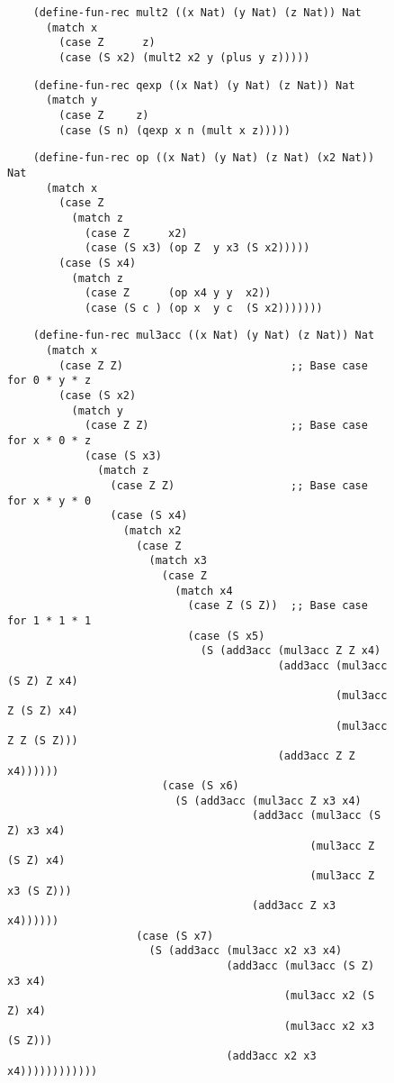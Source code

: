 \begin{figure}
  \begin{verbatim}
    (define-fun-rec mult2 ((x Nat) (y Nat) (z Nat)) Nat
      (match x
        (case Z      z)
        (case (S x2) (mult2 x2 y (plus y z)))))
  \end{verbatim}

  \begin{verbatim}
    (define-fun-rec qexp ((x Nat) (y Nat) (z Nat)) Nat
      (match y
        (case Z     z)
        (case (S n) (qexp x n (mult x z)))))
  \end{verbatim}

  \begin{verbatim}
    (define-fun-rec op ((x Nat) (y Nat) (z Nat) (x2 Nat)) Nat
      (match x
        (case Z
          (match z
            (case Z      x2)
            (case (S x3) (op Z  y x3 (S x2)))))
        (case (S x4)
          (match z
            (case Z      (op x4 y y  x2))
            (case (S c ) (op x  y c  (S x2)))))))
  \end{verbatim}

  \iffalse
  \begin{verbatim}
    (define-fun-rec mul3acc ((x Nat) (y Nat) (z Nat)) Nat
      (match x
        (case Z Z)                          ;; Base case for 0 * y * z
        (case (S x2)
          (match y
            (case Z Z)                      ;; Base case for x * 0 * z
            (case (S x3)
              (match z
                (case Z Z)                  ;; Base case for x * y * 0
                (case (S x4)
                  (match x2
                    (case Z
                      (match x3
                        (case Z
                          (match x4
                            (case Z (S Z))  ;; Base case for 1 * 1 * 1
                            (case (S x5)
                              (S (add3acc (mul3acc Z Z x4)
                                          (add3acc (mul3acc (S Z) Z x4)
                                                   (mul3acc Z (S Z) x4)
                                                   (mul3acc Z Z (S Z)))
                                          (add3acc Z Z x4))))))
                        (case (S x6)
                          (S (add3acc (mul3acc Z x3 x4)
                                      (add3acc (mul3acc (S Z) x3 x4)
                                               (mul3acc Z (S Z) x4)
                                               (mul3acc Z x3 (S Z)))
                                      (add3acc Z x3 x4))))))
                    (case (S x7)
                      (S (add3acc (mul3acc x2 x3 x4)
                                  (add3acc (mul3acc (S Z) x3 x4)
                                           (mul3acc x2 (S Z) x4)
                                           (mul3acc x2 x3 (S Z)))
                                  (add3acc x2 x3 x4))))))))))))
  \end{verbatim}
  \if


\end{figure}
